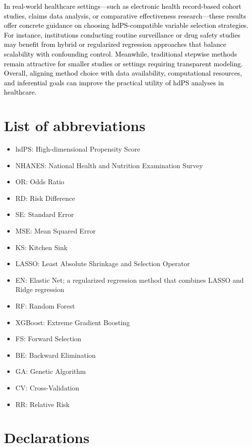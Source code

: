 \documentclass[10pt,letterpaper]{article}
\providecommand{\tightlist}{%
  \setlength{\itemsep}{0pt}\setlength{\parskip}{0pt}}
\begin{document}
\textcolor{black}{In real-world healthcare settings—such as electronic health record-based cohort studies, claims data analysis, or comparative effectiveness research—these results offer concrete guidance on choosing hdPS-compatible variable selection strategies. For instance, institutions conducting routine surveillance or drug safety studies may benefit from hybrid or regularized regression approaches that balance scalability with confounding control. Meanwhile, traditional stepwise methods remain attractive for smaller studies or settings requiring transparent modeling. Overall, aligning method choice with data availability, computational resources, and inferential goals can improve the practical utility of hdPS analyses in healthcare.}

\section*{List of abbreviations}\label{list-of-abbreviations}

\begin{itemize}
\tightlist
\item
  hdPS: High-dimensional Propensity Score
\item
  NHANES: National Health and Nutrition Examination Survey
\item
  OR: Odds Ratio
\item
  RD: Risk Difference
\item
  SE: Standard Error
\item
  MSE: Mean Squared Error
\item
  KS: Kitchen Sink
\item
  LASSO: Least Absolute Shrinkage and Selection Operator
\item
  EN: Elastic Net; a regularized regression method that combines LASSO
  and Ridge regression
\item
  RF: Random Forest
\item
  XGBoost: Extreme Gradient Boosting
\item
  FS: Forward Selection
\item
  BE: Backward Elimination
\item
  GA: Genetic Algorithm
\item
  CV: Cross-Validation
\item
  RR: Relative Risk
\end{itemize}

\section*{Declarations}\label{declarations}
\end{document}
